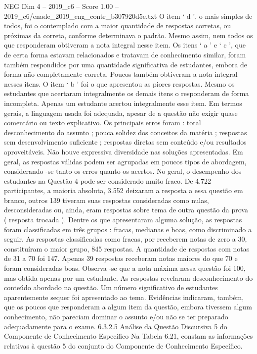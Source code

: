 \begin{textsample}{NEG Dim 4 – 2019\_c6 – Score 1.00 – 2019\_c6/enade\_2019\_eng\_contr\_b307920d5e.txt}
O item ‘ d ’, o mais simples de todos, foi o contemplado com a maior quantidade de respostas corretas, ou próximas da correta, conforme determinava o padrão.
Mesmo assim, nem todos os que responderam obtiveram a nota integral nesse item.
Os itens ‘ a ’ e ‘ c ’, que de certa forma estavam relacionados e tratavam de conhecimento similar, foram também respondidos por uma quantidade significativa de estudantes, embora de forma não completamente correta.
Poucos também obtiveram a nota integral nesses itens.
O item ‘ b ’ foi o que apresentou as piores respostas.
Mesmo os estudantes que acertaram integralmente os demais itens o responderam de forma incompleta.
Apenas um estudante acertou integralmente esse item.
Em termos gerais, a linguagem usada foi adequada, apesar de a questão não exigir quase comentário ou texto explicativo.
Os principais erros foram : total desconhecimento do assunto ; pouca solidez dos conceitos da matéria ; respostas sem desenvolvimento suficiente ; respostas diretas sem conteúdo e/ou resultados aproveitáveis.
Não houve expressiva diversidade nas soluções apresentadas.
Em geral, as respostas válidas podem ser agrupadas em poucos tipos de abordagem, considerando -se tanto os erros quanto os acertos.
No geral, o desempenho dos estudantes na Questão 4 pode ser considerado muito fraco.
De 4.722 participantes, a maioria absoluta, 3.552 deixaram a resposta a essa questão em branco, outros 139 tiveram suas respostas consideradas como nulas, desconsideradas ou, ainda, eram respostas sobre tema de outra questão da prova ( resposta trocada ).
Dentre os que apresentaram alguma solução, as respostas foram classificadas em três grupos : fracas, medianas e boas, como discriminado a seguir.
As respostas classificadas como fracas, por receberem notas de zero a 30, constituíram o maior grupo, 845 respostas.
A quantidade de respostas com notas de 31 a 70 foi 147.
Apenas 39 respostas receberam notas maiores do que 70 e foram consideradas boas.
Observa -se que a nota máxima nessa questão foi 100, mas obtida apenas por um estudante.
As respostas revelaram desconhecimento do conteúdo abordado na questão.
Um número significativo de estudantes aparentemente sequer foi apresentado ao tema.
Evidências indicaram, também, que os poucos que responderam a algum item da questão, embora tivessem algum conhecimento, não pareciam dominar o assunto e/ou não se ter preparado adequadamente para o exame. 6.3.2.5 Análise da Questão Discursiva 5 do Componente de Conhecimento Específico Na Tabela 6.21, constam as informações relativas à questão 5 do conjunto do Componente de Conhecimento Específico.

\end{textsample}
